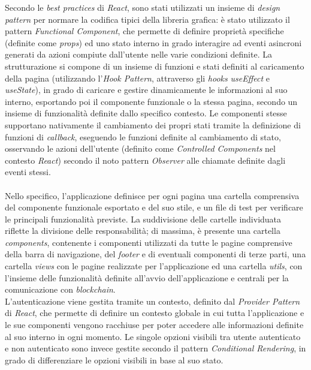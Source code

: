 Secondo le \textit{best practices} di \textit{React}, sono stati utilizzati un insieme di \textit{design pattern} per normare la codifica tipici della libreria grafica:
è stato utilizzato il pattern \textit{Functional Component}, che permette di definire proprietà specifiche (definite come \textit{props})
ed uno stato interno in grado interagire ad eventi asincroni generati da azioni compiute dall'utente nelle varie condizioni definite. La strutturazione si compone di un insieme di funzioni e stati definiti
al caricamento della pagina (utilizzando l'\textit{Hook Pattern}, attraverso gli \textit{hooks} \textit{useEffect} e \textit{useState}), in grado di caricare e gestire dinamicamente le informazioni
al suo interno, esportando poi il componente funzionale o la stessa pagina, secondo un insieme di funzionalità definite dallo specifico contesto. 
Le componenti stesse supportano nativamente il cambiamento dei propri stati tramite la definizione di funzioni di \textit{callback}, eseguendo le funzioni definite al cambiamento di stato,
osservando le azioni dell'utente (definito come \textit{Controlled Components} nel contesto \textit{React}) secondo il noto pattern \textit{Observer} alle chiamate definite dagli eventi stessi. \\
\\

\newpage
Nello specifico, l'applicazione definisce per ogni pagina una cartella comprensiva del componente funzionale
esportato e del suo stile, e un file di test per verificare le principali funzionalità previste.
La suddivisione delle cartelle individuata riflette la divisione delle responsabilità; di massima, è presente una cartella \textit{components}, contenente i componenti utilizzati da tutte le pagine 
comprensive della barra di navigazione, del \textit{footer} e di eventuali componenti di terze parti, una cartella \textit{views} con le pagine realizzate per l'applicazione ed
una cartella \textit{utils}, con l'insieme delle funzionalità definite all'avvio dell'applicazione e centrali per la comunicazione con \textit{blockchain}. \\
L'autenticazione viene gestita tramite un contesto, definito dal \textit{Provider Pattern} di \textit{React}, che permette di definire un contesto globale
in cui tutta l'applicazione e le sue componenti vengono racchiuse per poter accedere alle informazioni definite al suo interno in ogni momento.
Le singole opzioni visibili tra utente autenticato e non autenticato sono invece gestite secondo il pattern \textit{Conditional Rendering}, in grado di differenziare le opzioni
visibili in base al suo stato.

